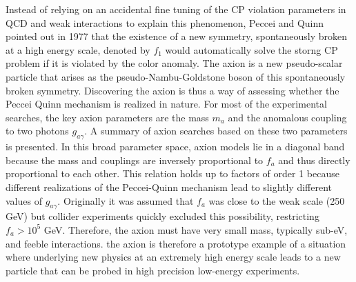 \documentclass[11pt]{book}
\begin{document}
Instead of relying on an accidental fine tuning of the CP violation parameters in QCD and weak interactions to explain this phenomenon, Peccei and Quinn pointed out in  1977 that the existence of a new symmetry, spontaneously broken at a high energy scale, denoted by $f_1$ would automatically solve the storng CP problem if it is violated by the color anomaly. The axion is a new pseudo-scalar particle that arises as the pseudo-Nambu-Goldstone boson of this spontaneously broken symmetry. Discovering the axion is thus a way of assessing whether the Peccei Quinn mechanism is realized in nature. For most of the experimental searches, the key axion parameters are the mass $m_a$ and the anomalous coupling to two photons $g_{a\gamma}$. A summary of axion searches based on these two parameters is presented. In this broad parameter space, axion models lie in a diagonal band because the mass and couplings are inversely proportional to $f_a$ and thus directly proportional to each other. This relation holds up to factors of order 1 because different realizations of the Peccei-Quinn mechanism lead to slightly different values of $g_{a\gamma}$.
Originally it was assumed that $f_a$ was close to the weak scale (250 GeV) but collider experiments quickly excluded this possibility, restricting $f_a > 10^5$ GeV. Therefore, the axion must have very small mass, typically sub-eV, and feeble interactions. the axion is therefore a prototype example of a situation where underlying new physics at an extremely high energy scale leads to a new particle that can be probed in high precision low-energy experiments.
\end{document}
